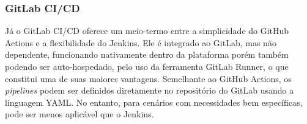 \subsubsection*{GitLab CI/CD}
Já o GitLab CI/CD oferece um meio-termo entre a simplicidade do GitHub Actions e a flexibilidade do Jenkins. Ele é integrado ao GitLab, mas não dependente, funcionando nativamente dentro da plataforma porém também podendo ser auto-hospedado, pelo uso da ferramenta GitLab Runner, o que constitui uma de suas maiores vantagens. Semelhante ao GitHub Actions, os \emph{pipelines} podem ser definidos diretamente no repositório do GitLab usando a linguagem YAML. No entanto, para cenários com necessidades bem específicas, pode ser menos aplicável que o Jenkins.




